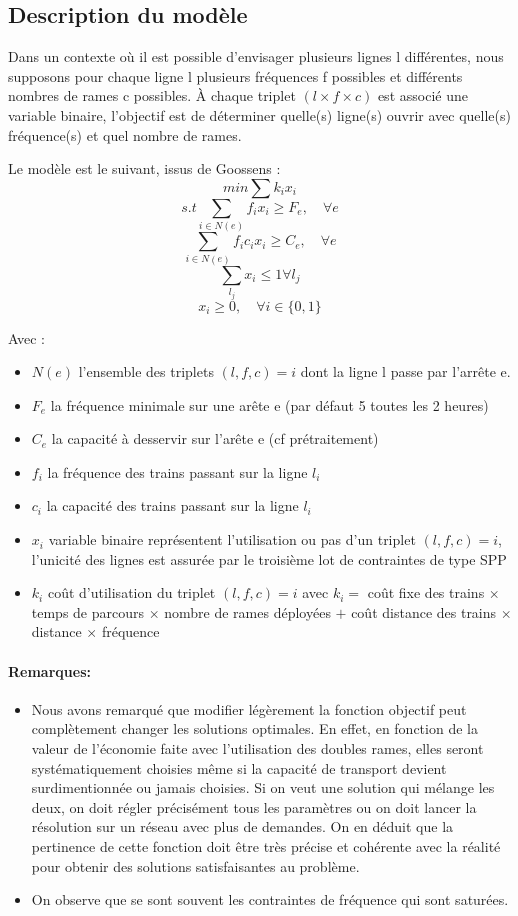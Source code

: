 \documentclass[a4paper,10pt]{article}
\begin{document}
\subsection{Description du modèle}
Dans un contexte où il est possible d'envisager plusieurs lignes l différentes, nous supposons pour chaque ligne l plusieurs fréquences f possibles et différents nombres de rames c possibles. À chaque triplet $(l \times f \times c)$ est associé une variable binaire, l'objectif est de déterminer quelle(s) ligne(s) ouvrir avec quelle(s) fréquence(s) et quel nombre de rames.

Le modèle est le suivant, issus de Goossens\cite{goossens2004branch} :
$$ min \sum k_i x_i$$
$$s.t \sum_{i\in N(e)} f_i x_i \geq F_e,  \quad \forall e$$
$$ \sum_{i\in N(e)} f_i c_i x_i \geq C_e, \quad \forall e$$
$$ \sum_{l_j} x_i \leq 1 \forall l_j$$
$$ x_i \geq 0, \quad \forall i \in \{0,1\}$$

Avec : 
\begin{itemize}
  \item $N(e)$ l'ensemble des triplets $(l,f,c)=i$ dont la ligne l passe par l'arrête e.
  \item $F_e$ la fréquence minimale sur une arête e (par défaut 5 toutes les 2 heures)
  \item $C_e$ la capacité à desservir sur l'arête e (cf prétraitement)
  \item $f_i$ la fréquence des trains passant sur la ligne $l_i$
  \item $c_i$ la capacité des trains passant sur la ligne $l_i$
  \item $x_i$ variable binaire représentent l'utilisation ou pas d'un triplet $(l,f,c)=i$, l'unicité des lignes est assurée par le troisième lot de contraintes de type SPP
  \item $k_i$ coût d'utilisation du triplet $(l,f,c)=i$ avec $k_i =$ coût fixe des trains $\times$ temps de parcours $\times$ nombre de rames déployées $+$ coût distance des trains $\times $ distance $\times$ fréquence
\end{itemize}


\paragraph{Remarques:}
\begin{itemize}
\item Nous avons remarqué que modifier légèrement la fonction objectif peut complètement changer les solutions optimales. En effet, en fonction de la valeur de l'économie faite avec l'utilisation des doubles rames, elles seront systématiquement choisies même si la capacité de transport devient surdimentionnée ou jamais choisies. Si on veut une solution qui mélange les deux, on doit régler précisément tous les paramètres ou on doit lancer la résolution sur un réseau avec plus de demandes. On en déduit que la pertinence de cette fonction doit être très précise et cohérente avec la réalité pour obtenir des solutions satisfaisantes au problème.
\item On observe que se sont souvent les contraintes de fréquence qui sont saturées.
\end{itemize}
\end{document}
